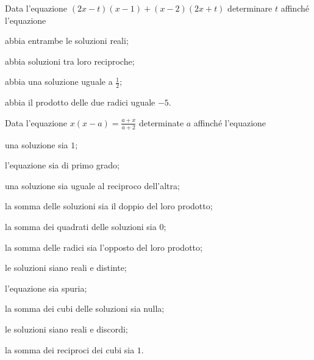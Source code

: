 \begin{esercizio}[\Ast] %
 \label{ese:3.113}
Data l'equazione $(2x-t)(x-1)+(x-2)(2x+t)$ determinare $t$ affinché l'equazione
\begin{enumeratea}
\item abbia entrambe le soluzioni reali;
\item abbia soluzioni tra loro reciproche;
\item abbia una soluzione uguale a $\frac{1}{2}$;
\item abbia il prodotto delle due radici uguale $-5$.
\end{enumeratea}
\end{esercizio}
\pagebreak
\begin{esercizio}[\Ast]
 \label{ese:3.114}
Data l'equazione $x (x-a) = \frac{a + x}{a + 2}$ determinate $a$ affinché l'equazione
\begin{enumeratea}
\item una soluzione sia $1$;
\item l'equazione sia di primo grado;
\item una soluzione sia uguale al reciproco dell'altra;
\item la somma delle soluzioni sia il doppio del loro prodotto;
\item la somma dei quadrati delle soluzioni sia $0$;
\item la somma delle radici sia l'opposto del loro prodotto;
\item le soluzioni siano reali e distinte;
\item l'equazione sia spuria;
\item la somma dei cubi delle soluzioni sia nulla;
\item le soluzioni siano reali e discordi;
\item la somma dei reciproci dei cubi sia $1$.
\end{enumeratea}
\end{esercizio}

